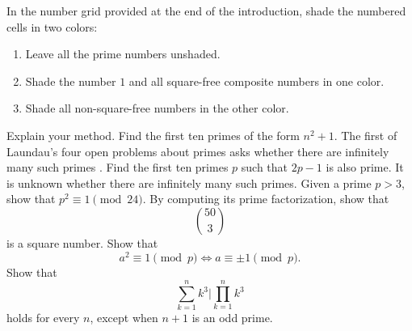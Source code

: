 \exercises

\begin{starter}
  \exercise \label{exercise:shading} In the number grid provided at the end of the introduction, shade the numbered cells in two colors:
  \begin{enumerate}
  \item Leave all the prime numbers unshaded.
  \item Shade the number $1$ and all square-free composite numbers in one color.
  \item Shade all non-square-free numbers in the other color.
  \end{enumerate}
  Explain your method.  
  \exercise Find the first ten primes of the form $n^2+1$. The first of Laundau's four open problems about primes asks whether there are infinitely many such primes \cite{landau1912}.
  \exercise Find the first ten primes $p$ such that $2p-1$ is also prime. It is unknown whether there are infinitely many such primes.
  \exercise Given a prime $p>3$, show that $p^2\equiv 1\pmod{24}$.
  \exercise By computing its prime factorization, show that
  \begin{equation*}
    \binom{50}{3}
  \end{equation*}
  is a square number.
  \exercise \label{exercise:self-inverse-modulo-prime}Show that
  \begin{equation*}
    a^2\equiv 1\pmod{p}\Leftrightarrow a\equiv\pm 1\pmod{p}.
  \end{equation*}
  \exercise Show that
  \begin{equation*}
    \sum_{k=1}^n k^3 \mathrel{\Big|} \prod_{k=1}^n k^3
  \end{equation*}
  holds for every $n$, except when $n+1$ is an odd prime.
\end{starter}

